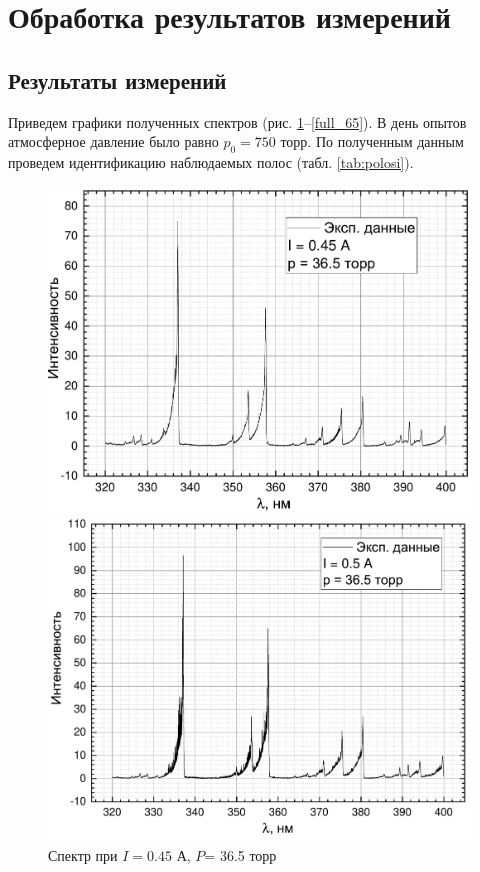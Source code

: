 \section{Обработка результатов измерений}
\subsection{Результаты измерений}
Приведем графики полученных спектров (рис. \ref{full_45}--\ref{full_65}). В день опытов атмосферное давление было равно $p_0 = 750$ торр. По полученным данным проведем идентификацию наблюдаемых полос (табл. \ref{tab:polosi}).
\begin{figure}[H]
	\begin{minipage}{0.45\linewidth}
		\centering
		\includegraphics[width=\linewidth]{data/graph_I=0,45}
		\caption{Спектр при $I= 0.45$ А, $P$= 36.5 торр}
		\label{full_45}
	\end{minipage} 
	\hfill
	\begin{minipage}[H]{0.45\linewidth}
		\centering
		\includegraphics[width=\linewidth]{data/graph_I=0,50}

\end{minipage}
\end{figure}
